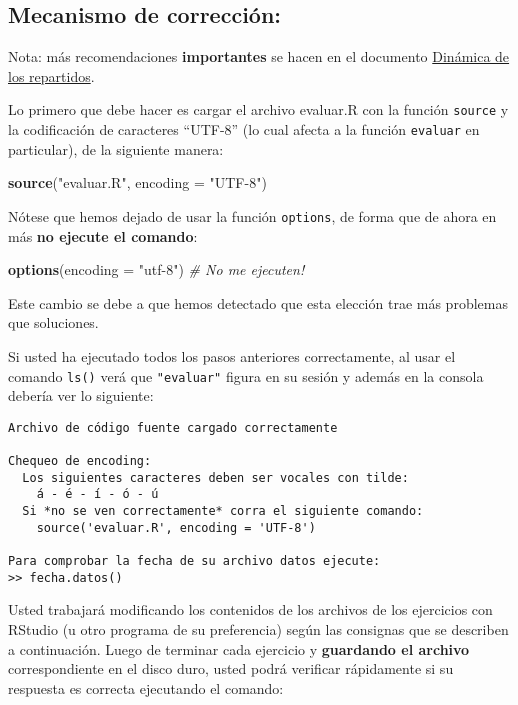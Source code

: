 \documentclass[]{article}
\newenvironment{Shaded}{}{}
\newcommand{\KeywordTok}[1]{\textcolor[rgb]{0.00,0.44,0.13}{\textbf{{#1}}}}
\newcommand{\DataTypeTok}[1]{\textcolor[rgb]{0.56,0.13,0.00}{{#1}}}
\newcommand{\StringTok}[1]{\textcolor[rgb]{0.25,0.44,0.63}{{#1}}}
\newcommand{\CommentTok}[1]{\textcolor[rgb]{0.38,0.63,0.69}{\textit{{#1}}}}
\newcommand{\NormalTok}[1]{{#1}}
\begin{document}
\subsection{Mecanismo de corrección:}

Nota: más recomendaciones \textbf{importantes} se hacen en el documento
\href{http://goo.gl/P5Wnq}{Dinámica de los repartidos}.

Lo primero que debe hacer es cargar el archivo evaluar.R con la función
\texttt{source} y la codificación de caracteres ``UTF-8'' (lo cual
afecta a la función \texttt{evaluar} en particular), de la siguiente
manera:

\begin{Shaded}
\begin{Highlighting}[]
\KeywordTok{source}\NormalTok{(}\StringTok{"evaluar.R"}\NormalTok{, }\DataTypeTok{encoding =} \StringTok{"UTF-8"}\NormalTok{)}
\end{Highlighting}
\end{Shaded}
Nótese que hemos dejado de usar la función \texttt{options}, de forma
que de ahora en más \textbf{no ejecute el comando}:

\begin{Shaded}
\begin{Highlighting}[]
\KeywordTok{options}\NormalTok{(}\DataTypeTok{encoding =} \StringTok{"utf-8"}\NormalTok{)  }\CommentTok{# No me ejecuten!}
\end{Highlighting}
\end{Shaded}
Este cambio se debe a que hemos detectado que esta elección trae más
problemas que soluciones.

Si usted ha ejecutado todos los pasos anteriores correctamente, al usar
el comando \texttt{ls()} verá que \texttt{"evaluar"} figura en su sesión
y además en la consola debería ver lo siguiente:

\begin{verbatim}
Archivo de código fuente cargado correctamente

Chequeo de encoding:
  Los siguientes caracteres deben ser vocales con tilde:
    á - é - í - ó - ú
  Si *no se ven correctamente* corra el siguiente comando:
    source('evaluar.R', encoding = 'UTF-8')

Para comprobar la fecha de su archivo datos ejecute:
>> fecha.datos()
\end{verbatim}
Usted trabajará modificando los contenidos de los archivos de los
ejercicios con RStudio (u otro programa de su preferencia) según las
consignas que se describen a continuación. Luego de terminar cada
ejercicio y \textbf{guardando el archivo} correspondiente en el disco
duro, usted podrá verificar rápidamente si su respuesta es correcta
ejecutando el comando:
\end{document}
